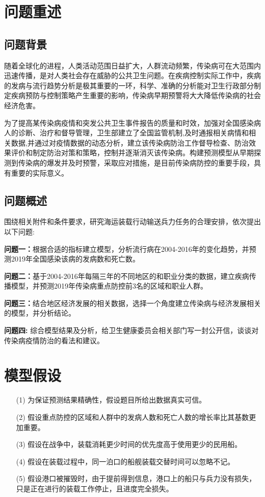 \documentclass{whutmod}
\begin{document}
	\section{问题重述}	
	\subsection{问题背景}
    随着全球化的进程，人类活动范围日益扩大，人群流动频繁，传染病可在大范围内迅速传播，是对人类社会存在威胁的公共卫生问题。在疾病控制实际工作中，疾病的发病与流行趋势分析是极其重要的一环，科学、准确的分析能对卫生行政部分制定疾病预防与控制策略产生重要的影响，传染病早期预警将大大降低传染病的社会经济危害。
    
    为了提高某传染病疫情和突发公共卫生事件报告的质量和时效，加强对全国感染病人的诊断、治疗和督导管理，卫生部建立了全国监管机制,及时通报相关病情和相关数据,并通过对疫情数据的动态分析，建立该传染病防治工作督导检查、防治效果评价和制定防治对策和策略，控制并逐渐消灭该传染病。构建预测模型从早期探测到传染病的爆发并及时预警，采取应对措施，是目前传染病防控的重要手段，具有重要的实际意义。
    
    

	\subsection{问题概述}
    围绕相关附件和条件要求，研究海运装载行动输送兵力任务的合理安排，依次提出以下问题:
		 
	
	\textbf{问题一：}根据合适的指标建立模型，分析流行病在2004-2016年的变化趋势，并预测2019年全国感染该病的发病数和死亡数。
	
	\textbf{问题二：}基于2004-2016年每隔三年的不同地区的和职业分类的数据，建立疾病传播模型，并预测2019年传染病重点防控前3名的区域和职业人群。
		
	\textbf{问题三：}结合地区经济发展的相关数据，选择一个角度建立传染病与经济发展相关的模型，并分析结论。
	
	\textbf{问题四: }综合模型结果及分析，给卫生健康委员会相关部门写一封公开信，谈谈对传染病疫情防治的看法和建议。
	
	
	\section{模型假设}
	\begin{itemize}                                             
		\item [(1)] 为保证预测结果精确性，假设题目所给出数据真实可信。
		\item [(2)] 假设重点防控的区域和人群中的发病人数和死亡人数的增长率比其基数更加重要。
		\item [(3)] 假设在战争中，装载消耗更少时间的优先度高于使用更少的民用船。
		\item [(4)] 假设在装载过程中，同一泊口的船舰装载交替时间可以忽略不记。
		\item [(5)] 假设港口被摧毁时，由于提前得到信息，港口上的船只与兵力没有损失，只是正在进行的装载工作停止，且进度完全损失。
	\end{itemize}
	
\end{document}
